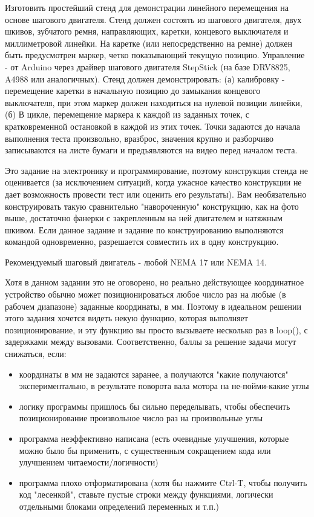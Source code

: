 

Изготовить простейший стенд для демонстрации линейного перемещения на основе шагового двигателя. Стенд должен состоять из шагового двигателя, двух шкивов, зубчатого ремня, направляющих, каретки, концевого выключателя и миллиметровой линейки. На каретке (или непосредственно на ремне) должен быть предусмотрен маркер, четко показывающий текущую позицию.  Управление - от Arduino через драйвер шагового двигателя StepStick (на базе DRV8825, A4988 или аналогичных). Стенд должен демонстрировать: (а) калибровку - перемещение каретки в начальную позицию до замыкания концевого выключателя, при этом маркер должен находиться на нулевой позиции линейки, (б) В цикле, перемещение маркера к каждой из заданных точек, с кратковременной остановкой в каждой из этих точек.  Точки задаются до начала выполнения теста произвольно, вразброс, значения крупно и разборчиво записываются на листе бумаги и предъявляются на видео перед началом теста.  

Это задание на электронику и программирование, поэтому конструкция стенда не оценивается (за исключением ситуаций, когда ужасное качество конструкции не дает возможность провести тест или оценить его результаты). Вам необязательно конструировать такую сравнительно "навороченную" конструкцию, как на фото выше,  достаточно фанерки с закрепленным на ней двигателем и натяжным шкивом. Если данное задание и задание по конструированию выполняются командой одновременно, разрешается совместить их в одну конструкцию.

Рекомендуемый шаговый двигатель - любой NEMA 17 или NEMA 14.

Хотя в данном задании это не оговорено,  но реально действующее координатное устройство обычно может позиционироваться любое число раз на любые (в рабочем диапазоне) заданные координаты, в мм.  Поэтому в идеальном решении этого задания хочется видеть некую функцию, которая выполняет позиционирование, и эту функцию вы просто вызываете несколько раз в loop(), с задержками между вызовами.  Соответственно, баллы за решение задачи могут снижаться, если:

\begin{itemize}
    \item координаты в мм не задаются заранее, а получаются "какие получаются" \linebreak экспериментально, в результате поворота вала мотора на не-пойми-какие  углы
    \item логику программы пришлось бы сильно переделывать,  чтобы обеспечить позиционирование произвольное число раз на произвольные углы
    \item программа неэффективно написана  (есть очевидные улучшения, которые можно было бы применить, с существенным сокращением кода или улучшением читаемости/логичности)
    \item программа плохо отформатирована (хотя бы нажмите Ctrl-T, чтобы получить код "лесенкой", ставьте пустые строки между функциями, логически отдельными блоками определений переменных и т.п.)
\end{itemize}

